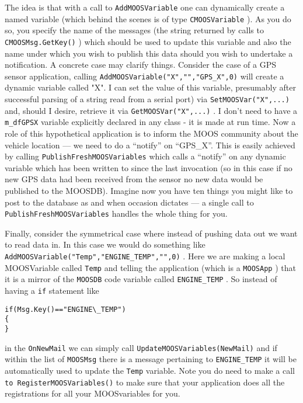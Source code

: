 \documentclass[a4paper,10pt]{article}
\newcommand{\Code}[1]{\texttt{#1} }
\newcommand{\code}[1]{\Code{#1} }
\begin{document}
The idea is that with a call to \code{AddMOOSVariable} one can dynamically create a named variable (which behind the scenes is of type \code{CMOOSVariable}). As you do so, you specify the name of the messages (the string returned by calls to \code{CMOOSMsg.GetKey()}) which should be used to update this variable and also the name under which you wish to publish this data should you wish to undertake a notification. 
A concrete case may clarify things. Consider the case of a GPS sensor application, calling \code{AddMOOSVariable("X","","GPS\_X",0)} will create a dynamic variable called "X". I can set the value of this variable, presumably after successful parsing of a string read from a serial port) via \code{SetMOOSVar("X",...)} and, should I desire, retrieve it via \code{GetMOOSVar("X",...)}. I don't need to have a \code{m\_dfGPSX} variable explicitly declared in any class - it is made at run time. Now a role of this hypothetical application is to inform the MOOS community about the vehicle location --- we need to do a ``notify'' on ``GPS\_X''. This is easily achieved by calling \code{PublishFreshMOOSVariables} which calls a ``notify'' on any dynamic variable which has been written to since the last invocation (so in this case if no new GPS data had been received from the sensor no new data would be published to the MOOSDB). Imagine now you have ten things you might like to post to the database as and when occasion dictates --- a single call to \code{PublishFreshMOOSVariables} handles the whole thing for you.

Finally, consider the symmetrical case where instead of pushing data out we want to read data in. In this case we would do something like \code{AddMOOSVariable("Temp","ENGINE\_TEMP","",0)}. Here we are making a local MOOSVariable called \code{Temp} and telling the application (which is a \code{MOOSApp}) that it is a mirror of the \code{MOOSDB} code variable called \code{ENGINE\_TEMP}. So instead of having a \code{if} statement like
\begin{lstlisting}
if(Msg.Key()=="ENGINE\_TEMP")
{
}
\end{lstlisting}
 in the \code{OnNewMail} we can simply call \code{UpdateMOOSVariables(NewMail)} and if within the list of \code{MOOSMsg} there is a message pertaining to \code{ENGINE\_TEMP} it will be automatically used to update the \code{Temp} variable. Note you do need to make a call \code{to RegisterMOOSVariables()} to make sure that your application does all the registrations for all your MOOSvariables for you.
\end{document}
